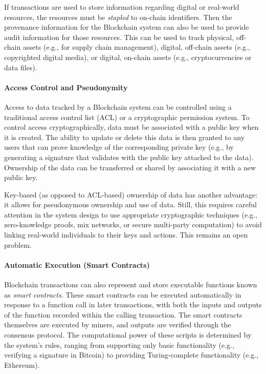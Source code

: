 If transactions are used to store information regarding digital or real-world resources, the resources must be \emph{stapled} to on-chain identifiers. Then the provenance information for the Blockchain system can also be used to provide audit information for those resources.
This can be used to track physical, off-chain assets (e.g., for supply chain management), digital, off-chain assets (e.g., copyrighted digital media), or digital, on-chain assets (e.g., cryptocurrencies or data files).
 
\paragraph{Access Control and Pseudonymity}
Access to data tracked by a Blockchain system can be controlled using a 
traditional access control list (ACL) or a cryptographic permission system.
To control access cryptographically, data must be associated with a public key 
when it is created.
The ability to update or delete this data is then granted to any users that can prove knowledge of the corresponding private key (e.g., by generating a signature that validates with the public key attached to the data).
Ownership of the data can be transferred or shared by associating it with a new public key.


Key-based (as opposed to ACL-based) ownership of data has another advantage: it allows for pseudonymous ownership and use of data.
Still, this requires careful attention in the system design to use appropriate cryptographic techniques (e.g., zero-knowledge proofs, mix networks, or secure multi-party computation) to avoid linking real-world individuals to their keys and actions. This remains an open problem.

\paragraph{Automatic Execution (Smart Contracts)}
Blockchain transactions can also represent and store executable functions known as \emph{smart contracts}.
These smart contracts can be executed automatically in response to a function call in later transactions, with both the inputs and outputs of the function recorded within the calling transaction.
The smart contracts themselves are executed by miners, and outputs are verified 
through the consensus protocol.
The computational power of these scripts is determined by the system's rules, ranging from supporting only basic functionality (e.g., verifying a signature in Bitcoin) to providing Turing-complete functionality (e.g., Ethereum).

